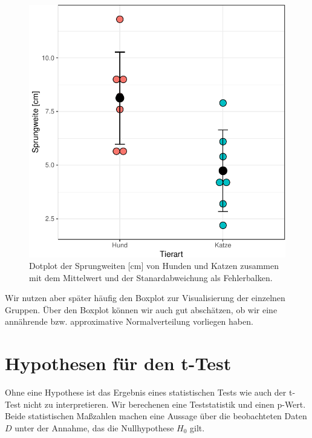 \documentclass[
  letterpaper,
]{scrbook}
\begin{document}
\begin{figure}

{\centering \includegraphics{./stat-tests-ttest_files/figure-pdf/fig-dotplot-ttest-1.pdf}

}

\caption{\label{fig-dotplot-ttest}Dotplot der Sprungweiten {[}cm{]} von
Hunden und Katzen zusammen mit dem Mittelwert und der Stanardabweichung
als Fehlerbalken.}

\end{figure}

Wir nutzen aber später häufig den Boxplot zur Visualisierung der
einzelnen Gruppen. Über den Boxplot können wir auch gut abschätzen, ob
wir eine annährende bzw. approximative Normalverteilung vorliegen haben.

\hypertarget{hypothesen-fuxfcr-den-t-test}{%
\section{Hypothesen für den t-Test}\label{hypothesen-fuxfcr-den-t-test}}

Ohne eine Hypothese ist das Ergebnis eines statistischen Tests wie auch
der t-Test nicht zu interpretieren. Wir berechenen eine Teststatistik
und einen p-Wert. Beide statistischen Maßzahlen machen eine Aussage über
die beobachteten Daten \(D\) unter der Annahme, das die Nullhypothese
\(H_0\) gilt.
\end{document}
